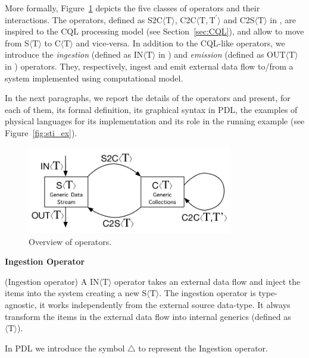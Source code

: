 More formally, Figure~\ref{fig:cm-op} depicts the five classes of \river{} operators and their interactions. 
The operators, defined as S2C$\langle\mathrm{T}\rangle$, C2C$\langle\mathrm{T},\mathrm{T^{\prime}}\rangle$ and C2S$\langle\mathrm{T}\rangle$ in \river{}, are inspired to the CQL processing model (see Section~\ref{sec:CQL}), and allow to move from S$\langle\mathrm{T}\rangle$ to C$\langle\mathrm{T}\rangle$ and vice-versa.
In addition to the CQL-like operators, we introduce the \textit{ingestion} (defined as IN$\langle\mathrm{T}\rangle$ in \river{}) and \textit{emission} (defined as OUT$\langle\mathrm{T}\rangle$ in \river{}) operators.
They, respectively, ingest and emit external data flow to/from a system implemented using \river{} computational model.

In the next paragraphs, we report the details of the operators and present, for each of them, its formal definition, its graphical syntax in PDL, the examples of physical languages for its implementation and its role in the running example (see Figure~\ref{fig:sti_ex}).

\begin{figure}[t]
    \centering
    \includegraphics[width=0.8\textwidth]{img/computational-model-operators}
    \caption{Overview of \textnormal{\protect\river{}} operators.}
    \label{fig:cm-op}
\end{figure}

\medskip
\noindent
\textbf{Ingestion Operator}
\medskip

\begin{Definition}
(Ingestion operator) A IN$\langle\mathrm{T}\rangle$ operator takes an external data flow and inject the items into the system creating a new S$\langle\mathrm{T}\rangle$. 
The ingestion operator is type-agnostic, it works independently from the external source data-type.
It always transform the items in the external data flow into internal generics (defined as $\langle\mathrm{T}\rangle$).
\end{Definition}

\noindent
In PDL we introduce the symbol $\bigtriangleup$ to represent the Ingestion operator.

